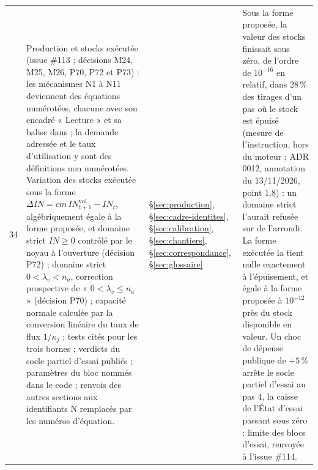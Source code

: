 \documentclass[11pt,a4paper]{article}
\newcommand{\code}[1]{\texttt{\detokenize{#1}}}
\begin{document}
\begin{center}
\begin{longtable}{p{0.5cm}>{\raggedright\arraybackslash}p{6.3cm}>{\raggedright\arraybackslash}p{2.1cm}>{\raggedright\arraybackslash}p{5.8cm}}
34 & Production et stocks exécutée (issue \#113 ; décisions M24, M25, M26, P70, P72 et P73) : les mécanismes N1 à N11 deviennent des équations numérotées, chacune avec son encadré « Lecture » et sa balise dans \code{nations.blocs.production} ; la demande adressée et le taux d'utilisation y sont des définitions non numérotées. Variation des stocks exécutée sous la forme $\Delta\mathit{IN} = \mathit{cm}\,\mathit{IN}^{\mathrm{vol}}_{t+1} - \mathit{IN}_t$, algébriquement égale à la forme proposée, et domaine strict $\mathit{IN} \ge 0$ contrôlé par le noyau à l'ouverture (décision P72) ; domaine strict $0 < \lambda_v < n_a$, correction prospective de « $0 < \lambda_v \le n_a$ » (décision P70) ; capacité normale calculée par la conversion linéaire du taux de flux $1/\kappa_j$ ; tests cités pour les trois bornes ; verdicts du socle partiel d'essai publiés ; paramètres du bloc nommés dans le code ; renvois des autres sections aux identifiants N remplacés par les numéros d'équation. & \S\ref{sec:production}, \S\ref{sec:cadre-identites}, \S\ref{sec:calibration}, \S\ref{sec:chantiers}, \S\ref{sec:correspondance}, \S\ref{sec:glossaire} & Sous la forme proposée, la valeur des stocks finissait sous zéro, de l'ordre de $10^{-16}$ en relatif, dans 28\,\% des tirages d'un pas où le stock est épuisé (mesure de l'instruction, hors du moteur ; ADR 0012, annotation du 13/11/2026, point 1.8) : un domaine strict l'aurait refusée sur de l'arrondi. La forme exécutée la tient nulle exactement à l'épuisement, et égale à la forme proposée à $10^{-12}$ près du stock disponible en valeur. Un choc de dépense publique de $+5\,\%$ arrête le socle partiel d'essai au pas 4, la caisse de l'État d'essai passant sous zéro : limite des blocs d'essai, renvoyée à l'issue \#114.\\

\end{longtable}
\end{center}
\end{document}
